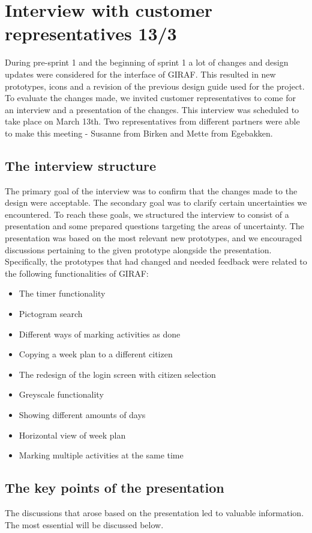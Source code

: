 \section{Interview with customer representatives 13/3}\label{interview13/3}
During pre-sprint 1 and the beginning of sprint 1 a lot of changes and design updates were considered for the interface of GIRAF.
This resulted in new prototypes, icons and a revision of the previous design guide used for the project.
To evaluate the changes made, we invited customer representatives to come for an interview and a presentation of the changes.
This interview was scheduled to take place on March 13th.
Two representatives from different partners were able to make this meeting - Susanne from Birken and Mette from Egebakken.

\subsection{The interview structure}
The primary goal of the interview was to confirm that the changes made to the design were acceptable.
The secondary goal was to clarify certain uncertainties we encountered.
To reach these goals, we structured the interview to consist of a presentation and some prepared questions targeting the areas of uncertainty.
The presentation was based on the most relevant new prototypes, and we encouraged discussions pertaining to the given prototype alongside the presentation.
Specifically, the prototypes that had changed and needed feedback were related to the following functionalities of GIRAF:
\begin{itemize}
    \item The timer functionality
    \item Pictogram search
    \item Different ways of marking activities as done
    \item Copying a week plan to a different citizen
    \item The redesign of the login screen with citizen selection
    \item Greyscale functionality
    \item Showing different amounts of days
    \item Horizontal view of week plan
    \item Marking multiple activities at the same time
\end{itemize}

\subsection{The key points of the presentation}
The discussions that arose based on the presentation led to valuable information.
The most essential will be discussed below.

